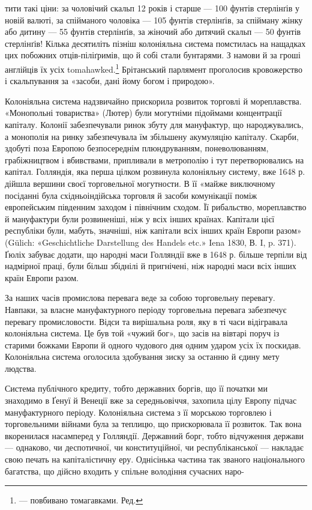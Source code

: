 тити такі ціни: за чоловічий скальп 12 років і старше — 100 фунтів стерлінґів у новій валюті, за
спійманого чоловіка — 105 фунтів стерлінґів, за спійману жінку або дитину — 55 фунтів стерлінґів, за
жіночий або дитячий скальп — 50 фунтів стерлінґів!
Кілька десятиліть пізніш колоніяльна система помстилась на нащадках цих побожних отців-піліґримів,
що й собі стали бунтарями. З намови й за гроші англійців їх усіх tomahawked.\footnote*{
— повбивано томагавками. Ред.
} Брітанський парлямент
проголосив кровожерство і скальпування
за «засоби, дані йому богом і природою».

Колоніяльна система надзвичайно прискорила розвиток торговлі й мореплавства. «Монопольні товариства»
(Лютер) були могутніми підоймами концентрації капіталу. Колонії забезпечували ринок збуту для
мануфактур, що народжувались, а монополія на ринку забезпечувала їм збільшену акумуляцію капіталу.
Скарби, здобуті поза Европою безпосереднім плюндруванням, поневолюванням, грабіжництвом і
вбивствами, припливали в метрополію і тут перетворювались на капітал. Голляндія, яка перша цілком
розвинула колоніяльну систему, вже 1648 р. дійшла вершини своєї торговельної могутности. В її «майже
виключному посіданні була східньоіндійська торговля й засоби
комунікації поміж европейським південним заходом і північним сходом. Її рибальство, мореплавство й
мануфактури були розвиненіші, ніж у всіх інших країнах. Капітали цієї республіки були, мабуть,
значніші, ніж капітали всіх інших країн Европи разом» (Gülich: «Geschichtliche Darstellung des
Handels etc.» Iena 1830, В. I, p. 371). Ґюліх забуває додати, що народні маси Голляндії вже в 1648
р. більше терпіли від надмірної праці, були більш збіднілі й пригнічені, ніж народні маси всіх інших
країн Европи разом.

За наших часів промислова перевага веде за собою торговельну перевагу. Навпаки, за власне
мануфактурного періоду торговельна перевага забезпечує перевагу промисловости. Відси та вирішальна
роля, яку в ті часи відігравала колоніяльна система. Це був той «чужий бог», що засів на вівтарі
поруч із старими божками Европи й одного чудового дня одним ударом усіх їх поскидав. Колоніяльна
система оголосила здобування зиску за останню й єдину мету людства.

Система публічного кредиту, тобто державних боргів, що її початки ми знаходимо в Ґенуї й Венеції вже
за середньовіччя, захопила цілу Европу підчас мануфактурного періоду. Колоніяльна система з її
морською торговлею і торговельними війнами була за теплицю, що прискорювала її розвиток. Так вона
вкоренилася насамперед у Голляндії. Державний борг, тобто відчуження держави — однаково, чи
деспотичної, чи конституційної, чи республіканської — накладає свою печать на капіталістичну еру.
Однісінька частина так званого національного багатства, що дійсно входить у спільне володіння
сучасних наро-